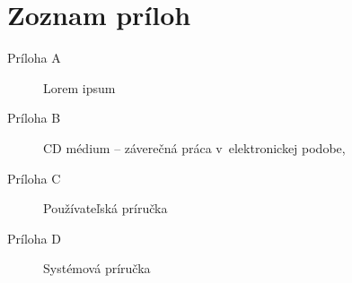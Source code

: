 
\chapter*{Zoznam príloh}

\begin{description}
	\item[Príloha A] Lorem ipsum
    \item[Príloha B] CD médium -- záverečná práca v~elektronickej podobe,
    \item[Príloha C] Používateľská príručka
    \item[Príloha D] Systémová príručka
\end{description}
